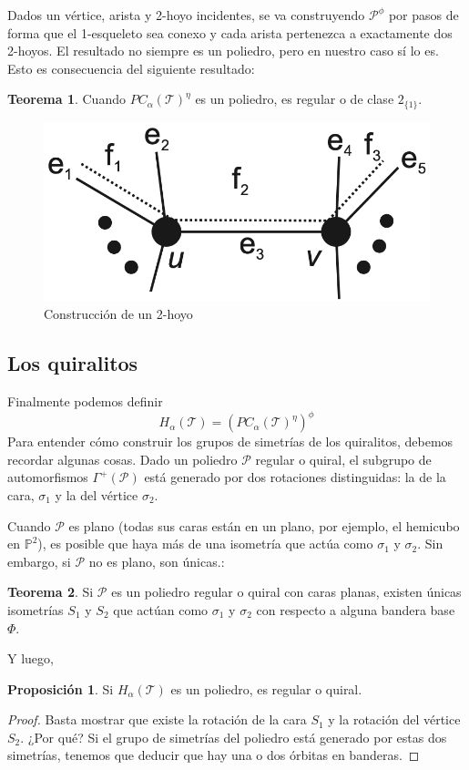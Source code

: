 \documentclass[spanish]{article}
\theoremstyle{definition}
\newtheorem*{teo}{Teorema}
\newtheorem*{prop}{Proposición}
\newcommand{\PP}{\mathbb{P}}
\newcommand{\p}{\mathcal{P}}
\newcommand{\T}{\mathcal{T}}
\begin{document}
Dados un vértice, arista y 2-hoyo incidentes, se va construyendo $\p^\phi$ por pasos de forma que el 1-esqueleto sea conexo y cada arista pertenezca a exactamente dos 2-hoyos. El resultado no siempre es un poliedro, pero en nuestro caso sí lo es. Esto es consecuencia del siguiente resultado:

\begin{teo}
	Cuando $PC_\alpha(\T)^\eta$ es un poliedro, es regular o de clase $2_{\{1\}}$.
\end{teo}

\begin{figure}[H]
	\centering
	\includegraphics[width=0.5\linewidth]{p4}
	\caption*{Construcción de un 2-hoyo}
\end{figure}

\subsection{Los quiralitos}
Finalmente podemos definir
\[H_\alpha(\T)=\left(PC_\alpha(\T)^\eta\right)^\phi\]
Para entender cómo construir los grupos de simetrías de los quiralitos, debemos recordar algunas cosas. Dado un poliedro $\p$ regular o quiral, el subgrupo de automorfismos $\Gamma^+(\p)$ está generado por dos rotaciones distinguidas: la de la cara, $\sigma_1$ y la del vértice $\sigma_2$.

Cuando $\p$ es plano (todas sus caras están en un plano, por ejemplo, el hemicubo en $\PP^2$), es posible que haya más de una isometría que actúa como $\sigma_1$ y $\sigma_2$.  Sin embargo, si $\p$ no es plano, son únicas.:
\begin{teo}
	Si $\p$ es un poliedro regular o quiral con caras planas, existen únicas isometrías $S_1$ y $S_2$ que actúan como $\sigma_1$ y $\sigma_2$ con respecto a alguna bandera base $\Phi$.
\end{teo}
Y luego,
\begin{prop}
	Si $H_\alpha(\T)$ es un poliedro, es regular o quiral.
\end{prop}
\begin{proof}
	Basta mostrar que existe la rotación de la cara $S_1$ y la rotación del vértice $S_2$. ¿Por qué? Si el grupo de simetrías del poliedro está generado por estas dos simetrías, tenemos que deducir que hay una o dos órbitas en banderas.
\end{proof}
\end{document}
